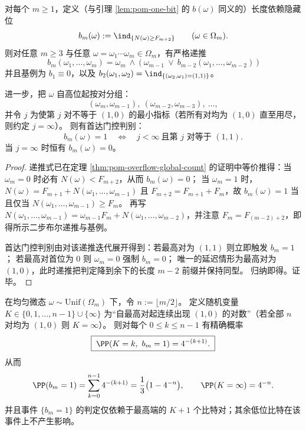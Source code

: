 \begin{proposition}[隐藏位的二步递推与首达门控判别]\label{prop:pom-hidden-bit-first-non10-gate}
对每个 \(m\ge 1\)，定义（与引理 \ref{lem:pom-one-bit} 的 \(b(\omega)\) 同义的）长度依赖隐藏位
\[
b_m(\omega):=\ind_{\{N(\omega)\ge F_{m+2}\}}\qquad(\omega\in\Omega_m).
\]
则对任意 \(m\ge 3\) 与任意 \(\omega=\omega_1\cdots\omega_m\in\Omega_m\)，有严格递推
\[
\boxed{\;
b_m(\omega_1,\dots,\omega_m)
=\omega_m\ \wedge\ \bigl(\ \omega_{m-1}\ \vee\ b_{m-2}(\omega_1,\dots,\omega_{m-2})\ \bigr)\;}
\]
并且基例为 \(b_1\equiv 0\)，以及
\(
b_2(\omega_1,\omega_2)=\ind_{\{(\omega_2,\omega_1)=(1,1)\}}
\)。
\par
进一步，把 \(\omega\) 自高位起按对分组：
\[
(\omega_m,\omega_{m-1}),\ (\omega_{m-2},\omega_{m-3}),\ \dots,
\]
并令 \(j\) 为使第 \(j\) 对不等于 \((1,0)\) 的最小指标（若所有对均为 \((1,0)\) 直至用尽，则约定 \(j=\infty\)）。
则有首达门控判别：
\[
\boxed{\;
b_m(\omega)=1\quad\Longleftrightarrow\quad j<\infty\ \text{且第 \(j\) 对等于 }(1,1).\;}
\]
当 \(j=\infty\) 时恒有 \(b_m(\omega)=0\)。
\end{proposition}

\begin{proof}
递推式已在定理 \ref{thm:pom-overflow-global-count} 的证明中等价推得：当 \(\omega_m=0\) 时必有 \(N(\omega)<F_{m+2}\)，从而 \(b_m(\omega)=0\)；
当 \(\omega_m=1\) 时，
\(
N(\omega)=F_{m+1}+N(\omega_1,\dots,\omega_{m-1})
\)
且 \(F_{m+2}=F_{m+1}+F_m\)，故 \(b_m(\omega)=1\) 当且仅当 \(N(\omega_1,\dots,\omega_{m-1})\ge F_m\)。
再写
\(
N(\omega_1,\dots,\omega_{m-1})=\omega_{m-1}F_m+N(\omega_1,\dots,\omega_{m-2})
\)，并注意 \(F_m=F_{(m-2)+2}\)，即得所示二步布尔递推与基例。
\par
首达门控判别由对该递推迭代展开得到：若最高对为 \((1,1)\) 则立即触发 \(b_m=1\)；
若最高对首位为 \(0\) 则 \(\omega_m=0\) 强制 \(b_m=0\)；
唯一的延迟情形为最高对为 \((1,0)\)，此时递推把判定降到余下的长度 \(m-2\) 前缀并保持同型。
归纳即得。证毕。
\end{proof}

\begin{corollary}[隐藏位触发位置的几何律与门控局部性]\label{cor:pom-hidden-bit-trigger-geometry-law}
在均匀微态 \(\omega\sim\mathrm{Unif}(\Omega_m)\) 下，令 \(n:=\lfloor m/2\rfloor\)。
定义随机变量 \(K\in\{0,1,\dots,n-1\}\cup\{\infty\}\) 为“自最高对起连续出现 \((1,0)\) 的对数”（若全部 \(n\) 对均为 \((1,0)\) 则 \(K=\infty\)）。
则对每个 \(0\le k\le n-1\) 有精确概率
\[
\boxed{\;\PP(K=k,\ b_m=1)=4^{-(k+1)}.\;}
\]
从而
\[
\PP(b_m=1)=\sum_{k=0}^{n-1}4^{-(k+1)}=\frac13\bigl(1-4^{-n}\bigr),
\qquad
\PP(K=\infty)=4^{-n}.
\]
并且事件 \(\{b_m=1\}\) 的判定仅依赖于最高端的 \(K+1\) 个比特对；其余低位比特在该事件上不产生影响。
\end{corollary}

